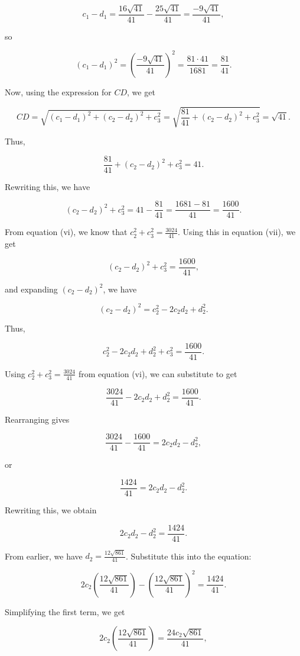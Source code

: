 \[ c_1 - d_1 = \frac{16 \sqrt{41}}{41} - \frac{25 \sqrt{41}}{41} = \frac{-9 \sqrt{41}}{41}, \]

so 

\[ (c_1 - d_1)^2 = \left(\frac{-9 \sqrt{41}}{41}\right)^2 = \frac{81 \cdot 41}{1681} = \frac{81}{41}. \]

Now, using the expression for $CD$, we get

\[ CD = \sqrt{(c_1 - d_1)^2 + (c_2 - d_2)^2 + c_3^2} = \sqrt{\frac{81}{41} + (c_2 - d_2)^2 + c_3^2} = \sqrt{41}. \]

Thus,

\[ \frac{81}{41} + (c_2 - d_2)^2 + c_3^2 = 41. \]

Rewriting this, we have

\[ (c_2 - d_2)^2 + c_3^2 = 41 - \frac{81}{41} = \frac{1681 - 81}{41} = \frac{1600}{41}. \tag*{(vii)} \]

From equation (vi), we know that $c_2^2 + c_3^2 = \frac{3024}{41}$. Using this in equation (vii), we get

\[ (c_2 - d_2)^2 + c_3^2 = \frac{1600}{41}, \]

and expanding $(c_2 - d_2)^2$, we have

\[ (c_2 - d_2)^2 = c_2^2 - 2 c_2 d_2 + d_2^2. \]

Thus,

\[ c_2^2 - 2 c_2 d_2 + d_2^2 + c_3^2 = \frac{1600}{41}. \]

Using $c_2^2 + c_3^2 = \frac{3024}{41}$ from equation (vi), we can substitute to get

\[ \frac{3024}{41} - 2 c_2 d_2 + d_2^2 = \frac{1600}{41}. \]

Rearranging gives

\[ \frac{3024}{41} - \frac{1600}{41} = 2 c_2 d_2 - d_2^2, \]

or

\[ \frac{1424}{41} = 2 c_2 d_2 - d_2^2. \]

Rewriting this, we obtain

\[ 2 c_2 d_2 - d_2^2 = \frac{1424}{41}. \]

From earlier, we have $d_2 = \frac{12 \sqrt{861}}{41}$. Substitute this into the equation:

\[ 2 c_2 \left(\frac{12 \sqrt{861}}{41}\right) - \left(\frac{12 \sqrt{861}}{41}\right)^2 = \frac{1424}{41}. \]

Simplifying the first term, we get

\[ 2 c_2 \left(\frac{12 \sqrt{861}}{41}\right) = \frac{24 c_2 \sqrt{861}}{41}, \]

